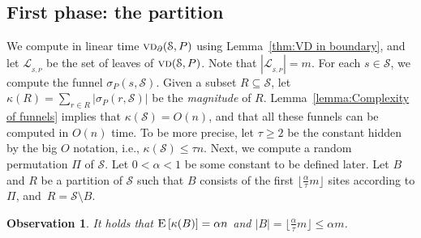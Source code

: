 \documentclass[a4paper,UKenglish]{socg-lipics-v2018}
\newtheorem{observation}[theorem]{Observation}
\newcommand{\s}{\mathcal S}
\newcommand{\funnel}[2][P]{\ensuremath{\sigma_{\scriptscriptstyle #1}(#2)}}
\newcommand{\vd}[2][P]{\textsc{vd}(#2, #1)}
\newcommand{\cost}[1]{\kappa(#1)}
\newcommand{\bvd}[2][P]{\textsc{vd}_{\partial}(#2, #1)}
\newcommand{\ex}[1]{\textsc{E}\left[#1\right]}
\newcommand{\LL}[1][\s, P]{\ensuremath{\mathcal L_{_{#1}}}}
\begin{document}
\subsection{First phase: the partition}\label{section:First phase}
We compute in linear time $\bvd{\s}$ using Lemma~\ref{thm:VD in boundary}, and let $\LL$ be the set of leaves of $\vd{\s}$. Note that $|\LL| = m$. 
For each $s\in \s$, we compute the funnel $\funnel{s, \s}$. 
Given a subset $R\subseteq \s$, let $\cost{R} = \sum_{r\in R} |\funnel{r, \s}|$ be the \emph{magnitude} of $R$. 
Lemma~\ref{lemma:Complexity of funnels} implies that $\cost{\s} = O(n)$, and that all these funnels can be computed in $O(n)$ time. 
To be more precise, let $\tau\geq 2$ be the constant hidden by the big $O$ notation, i.e., $\cost{\s} \leq \tau n$. 
Next, we compute a random permutation $\Pi$ of $\s$. 
Let $0 < \alpha < 1$ be some constant to be defined later. 
Let $B$ and $R$ be a partition of $\s$ such that $B$ consists of the first $\lfloor \frac{\alpha}{\tau} m\rfloor$ sites according to $\Pi$, and~$R = \s\setminus B$. 

\begin{observation}\label{obs: Complexity of B and R}
It holds that $\ex{\cost{B}} = \alpha n$ and $|B|= \lfloor \frac{\alpha}{\tau} m\rfloor \leq \alpha m$. 
\end{observation}

\end{document}
